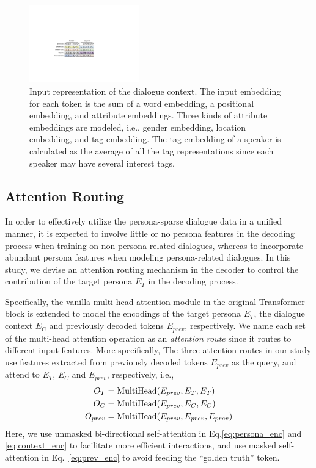 \documentclass[letterpaper]{article} %
\begin{document}
\begin{figure}[t]
    \centering
    \includegraphics[width=180px]{figures/fig_encoder.pdf}
    \caption{Input representation of the dialogue context. The input embedding for each token is the sum of a word embedding, a positional embedding, and attribute embeddings. Three kinds of attribute embeddings are modeled, i.e., gender embedding, location embedding, and tag embedding. The tag embedding of a speaker is calculated as the average of all the tag representations since each speaker may have several interest tags.}
    \label{fig:context_rep}
\end{figure}

\subsection{Attention Routing}
In order to effectively utilize the persona-sparse dialogue data in a unified manner, it is expected to involve little or no persona features in the decoding process when training on non-persona-related dialogues, whereas to incorporate abundant persona features when modeling persona-related dialogues. In this study, we devise an attention routing mechanism in the decoder to control the contribution of the target persona $E_T$ in the decoding process.

Specifically, the vanilla multi-head attention module in the original Transformer block is extended to model the encodings of the target persona $E_T$, the dialogue context $E_C$ and previously decoded tokens $E_{prev}$, respectively. We name each set of the multi-head attention operation as an \emph{attention route} since it routes to different input features. More specifically, The three attention routes in our study use features extracted from previously decoded tokens $E_{prev}$ as the query, and attend to $E_T$, $E_C$ and $E_{prev}$, respectively, i.e.,
\begin{align}
 O_T &= {\rm MultiHead}(E_{prev}, E_T, E_T)\label{eq:persona_enc} \\
 O_C &= {\rm MultiHead}(E_{prev}, E_C, E_C)\label{eq:context_enc} \\
 O_{prev} &= {\rm MultiHead}(E_{prev}, E_{prev}, E_{prev})\label{eq:prev_enc}
\end{align}
Here, we use unmasked bi-directional self-attention in Eq.\ref{eq:persona_enc} and \ref{eq:context_enc} to facilitate more efficient interactions, and use masked self-attention in Eq.~\ref{eq:prev_enc} to avoid feeding the ``golden truth'' token.
\end{document}
